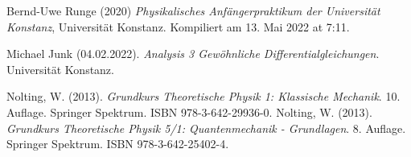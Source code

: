 \documentclass[../main.tex]{subfiles}
\begin{document}
	\begin{thebibliography}{99}
		 Bernd-Uwe Runge (2020) \emph{Physikalisches Anfängerpraktikum der Universität Konstanz}, Universität Konstanz. Kompiliert am 13. Mai 2022 at 7:11. 

		 Michael Junk (04.02.2022). \emph{Analysis 3 Gewöhnliche Differentialgleichungen}. Universität Konstanz.

		 Nolting, W. (2013). \emph{Grundkurs Theoretische Physik 1: Klassische Mechanik}. 10. Auflage. Springer Spektrum. ISBN 978-3-642-29936-0.
		 Nolting, W. (2013). \emph{Grundkurs Theoretische Physik 5/1: Quantenmechanik - Grundlagen}. 8. Auflage. Springer Spektrum. ISBN 978-3-642-25402-4.

		



\end{thebibliography}
\end{document}
